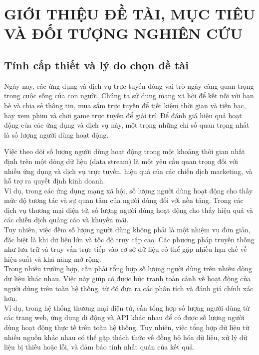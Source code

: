 \documentclass[letterpaper,13pt]{article}
\theoremstyle{mytheor}
\begin{document}



\renewcommand{\contentsname}{Content}
\newpage
\vspace{1cm}
\tableofcontents
\newpage
\section{GIỚI THIỆU ĐỀ TÀI, MỤC TIÊU VÀ ĐỐI TƯỢNG NGHIÊN CỨU}
\subsection{Tính cấp thiết và lý do chọn đề tài}
\hspace{2em}Ngày nay, các ứng dụng và dịch vụ trực tuyến đóng vai trò ngày càng quan trọng trong cuộc sống của con người. 
Chúng ta sử dụng mạng xã hội để kết nối với bạn bè và chia sẻ thông tin, mua sắm trực tuyến để tiết kiệm thời gian và tiền bạc, 
hay xem phim và chơi game trực tuyến để giải trí. Để đánh giá hiệu quả hoạt động của các ứng dụng và dịch vụ này, 
một trọng những chỉ số quan trọng nhất là số lượng người dùng hoạt động.

Việc theo dõi số lượng người dùng hoạt động trong một khoảng thời gian nhất định trên một dòng dữ liệu (data stream) 
là một yêu cầu quan trọng đối với nhiều ứng dụng và dịch vụ trực tuyến, hiệu quả của các chiến dịch marketing, 
và hỗ trợ ra quyết định kinh doanh.\\
Ví dụ, trong các ứng dụng mạng xã hội, số lượng người dùng hoạt động cho thấy mức độ tương tác 
và sự quan tâm của người dùng đối với nền tảng. Trong các dịch vụ thương mại điện tử, số lượng người dùng hoạt động cho thấy hiệu quả 
và các chiến dịch quảng cáo và khuyến mãi. \\
Tuy nhiên, việc đếm số lượng người dùng không phải là một nhiệm vụ đơn giản, đặc biệt là khi dữ liệu lớn 
và tốc độ truy cập cao. Các phương pháp truyền thống như lưu trữ và truy vấn trực tiếp vào cơ sở dữ liệu có thể gặp nhiều hạn chế về hiệu suất 
và khả năng mở rộng.\\

Trong nhiều trường hợp, cần phải tổng hợp số lượng người dùng trên nhiều dòng dữ liệu khác nhau. Việc này giúp có được bức tranh toàn cảnh về hoạt động 
của người dùng trên toàn hệ thống, từ đó đưa ra các phân tích và đánh giá chính xác hơn.\\
Ví dụ, trong hệ thống thương mại điện tử, cần tổng hợp số lượng người dùng từ các trang web, ứng dụng di động và API khác nhau để có được số lượng 
người dùng hoạt động thực tế trên toàn hệ thống. 
Tuy nhiên, việc tổng hợp dữ liệu từ nhiều nguồn khác nhau có thể gặp thách thức về đồng bộ hóa dữ liệu, xử lý dữ liệu bị thiếu hoặc lỗi, 
và đảm bảo tính nhất quán của kết quả. 
\end{document}
